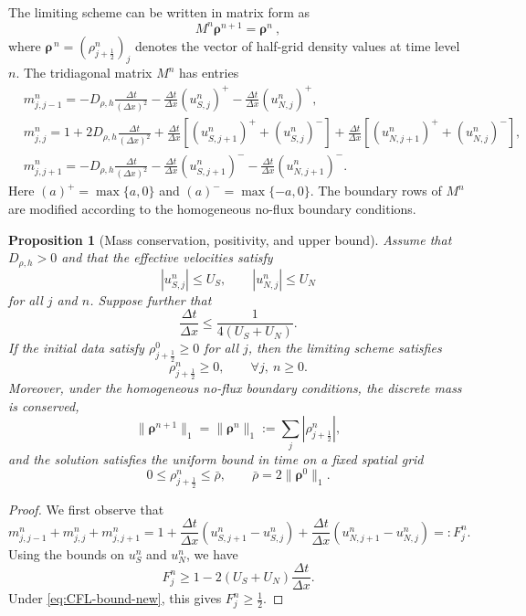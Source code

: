 \documentclass[11pt,twoside]{article}
\numberwithin{equation}{section}
\theoremstyle{plain}
\newtheorem{proposition}[theorem]{Proposition}
\theoremstyle{nonumberplain}
\newtheorem{proof}{Proof.-}
\newcommand{\brho}{\boldsymbol{\rho}}
\begin{document}
{%

The limiting scheme can be written in matrix form as
\[
M^n\brho^{n+1}=\brho^n \ ,
\]
where
 $\boldsymbol{\rho}^{\,n}
=
(\rho_{j+\frac12}^n)_j$
denotes the vector of half-grid density values at time level $n$.
The tridiagonal matrix $M^n$ has entries
\begin{align*}
&m_{j,j-1}^n
=
-D_{\rho,h}\frac{\Delta t}{(\Delta x)^2}
-\frac{\Delta t}{\Delta x}(u_{S,j}^n)^+
-\frac{\Delta t}{\Delta x}(u_{N,j}^n)^+,\\
&m_{j,j}^n
=
1+2D_{\rho,h}\frac{\Delta t}{(\Delta x)^2}
+\frac{\Delta t}{\Delta x}
\left[(u_{S,j+1}^n)^+ +(u_{S,j}^n)^-\right]
+\frac{\Delta t}{\Delta x}
\left[(u_{N,j+1}^n)^+ +(u_{N,j}^n)^-\right],\\
&m_{j,j+1}^n
=
-D_{\rho,h}\frac{\Delta t}{(\Delta x)^2}
-\frac{\Delta t}{\Delta x}(u_{S,j+1}^n)^-
-\frac{\Delta t}{\Delta x}(u_{N,j+1}^n)^- .
\end{align*}
Here $(a)^+=\max\{a,0\}$ and $(a)^-=\max\{-a,0\}$.
The boundary rows of \(M^n\) are modified according to the homogeneous
no-flux boundary conditions.


\begin{proposition}[Mass conservation, positivity, and upper bound]
Assume that $D_{\rho,h}>0$ and that the effective velocities satisfy
\[
|u_{S,j}^n|\le U_S,\qquad |u_{N,j}^n|\le U_N
\]
for all $j$ and $n$. Suppose further that
\begin{equation}\label{eq:CFL-bound-new}
\frac{\Delta t}{\Delta x}
\le
\frac{1}{4(U_S+U_N)} .
\end{equation}
If the initial data satisfy $\rho_{j+\frac12}^0\ge0$ for all $j$, then the
limiting scheme satisfies
\[
\rho_{j+\frac12}^n\ge0,\qquad \forall j,\ n\ge0.
\]
Moreover, under the homogeneous no-flux boundary conditions, the discrete
mass is conserved,
\[
\|\brho^{n+1}\|_1=\|\brho^n\|_1 := \sum_j|\rho^n_{j+\frac12}|,
\]
and the solution satisfies the uniform bound in time on a fixed spatial grid
\[
0\le \rho_{j+\frac12}^n\le \bar\rho,\qquad
\bar\rho=2\|\brho^0\|_1 .
\]
\end{proposition}

\begin{proof}{\rm
We first observe that
\[
m_{j,j-1}^n+m_{j,j}^n+m_{j,j+1}^n
=
1+\frac{\Delta t}{\Delta x}
\left(u_{S,j+1}^n-u_{S,j}^n\right)
+\frac{\Delta t}{\Delta x}
\left(u_{N,j+1}^n-u_{N,j}^n\right)
=:F_j^n .
\]
Using the bounds on $u_S^n$ and $u_N^n$, we have
\[
F_j^n
\ge
1-2(U_S+U_N)\frac{\Delta t}{\Delta x}.
\]
Under \eqref{eq:CFL-bound-new}, this gives
$
F_j^n\ge \frac12 .
$

}
\end{proof}}
\end{document}

